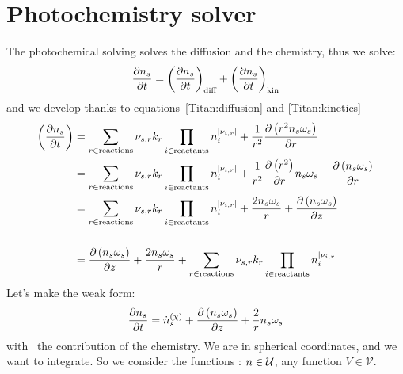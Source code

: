 \section{Photochemistry solver}

The photochemical solving solves the diffusion and the chemistry, thus we solve:
\begin{equation}
\frac{\partial n_s}{\partial t} = \left(\frac{\partial n_s}{\partial t}\right)_\text{diff} + \left(\frac{\partial n_s}{\partial t}\right)_\text{kin}
\end{equation}
and we develop thanks to equations~\ref{Titan:diffusion} and \ref{Titan:kinetics}
\begin{equation}
\begin{split}
\left(\frac{\partial n_s}{\partial t}\right) & = \sum_{r\in \text{reactions}} {\nu_{s,r}}k_{r} \prod_{i\in\text{reactants}}n_i^{|{\nu_{i,r}}|} +
                                     \frac{1}{r^2}\frac{\partial\left(r^2n_s\omega_s\right)}{\partial r} \\
                                 & = \sum_{r\in \text{reactions}} {\nu_{s,r}} k_r\prod_{i\in\text{reactants}}n_i^{|{\nu_{i,r}}|} +
                                     \frac{1}{r^2}\frac{\partial\left(r^2\right)}{\partial r}n_s\omega_s + \frac{\partial\left(n_s\omega_s\right)}{\partial r} \\
                                 & = \sum_{r\in \text{reactions}} {\nu_{s,r}} k_{r}\prod_{i\in\text{reactants}}n_i^{|{\nu_{i,r}}|} +
                                     \frac{2n_s\omega_s}{r} + \frac{\partial\left(n_s\omega_s\right)}{\partial z} \\[\baselineskip]
                                 & = \frac{\partial\left(n_s\omega_s\right)}{\partial z} + \frac{2n_s\omega_s}{r} + \sum_{r\in \text{reactions}} {\nu_{s,r}} k_{r}\prod_{i\in\text{reactants}}n_i^{|{\nu_{i,r}}|} 
\end{split}
\end{equation}
Let's make the weak form:
\begin{equation}
\frac{\partial n_s}{\partial t} = \dot{n}^{(\chi)}_s + \frac{\partial\left(n_s\omega_s\right)}{\partial z} + \frac{2}{r}n_s\omega_s
\end{equation}
with \omegadot\ the contribution of the chemistry.
We are in spherical coordinates, and we want to integrate.
So we consider the functions \conc:
$n \in \mathcal{U}$, any function $V \in \mathcal{V}$.
